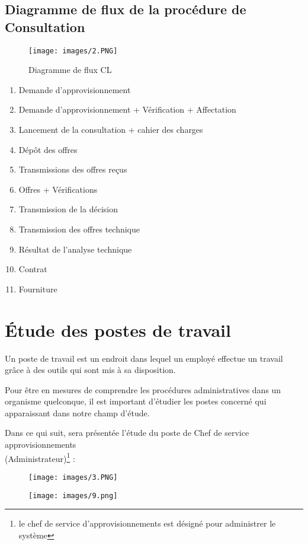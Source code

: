 \documentclass{report}
\begin{document}
\newpage
\subsection{Diagramme de flux de la procédure de Consultation}
 \begin{figure}[h]
        \centering
            \texttt{[image: images/2.PNG]}
        \caption{Diagramme de flux CL}
 \end{figure}


\begin{enumerate}
    \item Demande d’approvisionnement
    \item Demande d’approvisionnement + Vérification + Affectation
    \item Lancement de la consultation + cahier des charges
    \item Dépôt des offres
    \item Transmissions des offres reçus
    \item Offres + Vérifications
    \item Transmission de la décision
    \item Transmission des offres technique
    \item Résultat de l’analyse technique
    \item Contrat 
    \item Fourniture
\end{enumerate}

\newpage
\section{Étude des postes de travail}
Un poste de travail est un endroit dans lequel un employé effectue un travail grâce à des outils qui sont mis à sa disposition.

Pour être en mesures de comprendre les procédures administratives dans un organisme quelconque, il est important d’étudier les postes concerné qui apparaissant dans notre champ d’étude.

Dans ce qui suit, sera présentée l’étude du poste de Chef de service approvisionnements\\
(Administrateur)\protect\footnote{le chef de service d’approvisionnements est désigné pour administrer le système} :

   \begin{figure}[h]
       \centering
          \texttt{[image: images/3.PNG]}
    \end{figure}
\vspace{0.3cm}
    \begin{figure}[h]
        \centering
            \texttt{[image: images/9.png]}
    \end{figure}
    
\end{document}
